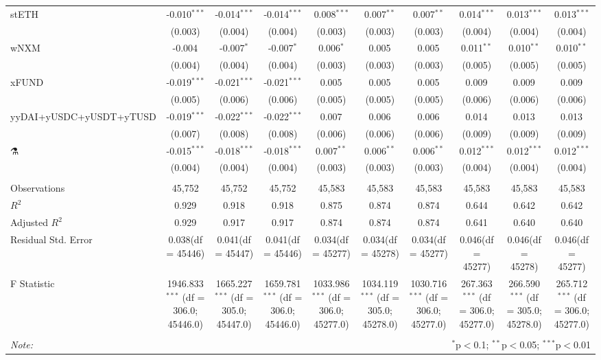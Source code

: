 \begin{table}[!htbp]
\begin{tabular}{@{\extracolsep{5pt}}lccccccccc}
 stETH & -0.010$^{***}$ & -0.014$^{***}$ & -0.014$^{***}$ & 0.008$^{***}$ & 0.007$^{**}$ & 0.007$^{**}$ & 0.014$^{***}$ & 0.013$^{***}$ & 0.013$^{***}$ \\
  & (0.003) & (0.004) & (0.004) & (0.003) & (0.003) & (0.003) & (0.004) & (0.004) & (0.004) \\
 wNXM & -0.004$^{}$ & -0.007$^{*}$ & -0.007$^{*}$ & 0.006$^{*}$ & 0.005$^{}$ & 0.005$^{}$ & 0.011$^{**}$ & 0.010$^{**}$ & 0.010$^{**}$ \\
  & (0.004) & (0.004) & (0.004) & (0.003) & (0.003) & (0.003) & (0.005) & (0.005) & (0.005) \\
 xFUND & -0.019$^{***}$ & -0.021$^{***}$ & -0.021$^{***}$ & 0.005$^{}$ & 0.005$^{}$ & 0.005$^{}$ & 0.009$^{}$ & 0.009$^{}$ & 0.009$^{}$ \\
  & (0.005) & (0.006) & (0.006) & (0.005) & (0.005) & (0.005) & (0.006) & (0.006) & (0.006) \\
 yyDAI+yUSDC+yUSDT+yTUSD & -0.019$^{***}$ & -0.022$^{***}$ & -0.022$^{***}$ & 0.007$^{}$ & 0.006$^{}$ & 0.006$^{}$ & 0.014$^{}$ & 0.013$^{}$ & 0.013$^{}$ \\
  & (0.007) & (0.008) & (0.008) & (0.006) & (0.006) & (0.006) & (0.009) & (0.009) & (0.009) \\
 ⚗️ & -0.015$^{***}$ & -0.018$^{***}$ & -0.018$^{***}$ & 0.007$^{**}$ & 0.006$^{**}$ & 0.006$^{**}$ & 0.012$^{***}$ & 0.012$^{***}$ & 0.012$^{***}$ \\
  & (0.004) & (0.004) & (0.004) & (0.003) & (0.003) & (0.003) & (0.004) & (0.004) & (0.004) \\
\hline \\[-1.8ex]
 Observations & 45,752 & 45,752 & 45,752 & 45,583 & 45,583 & 45,583 & 45,583 & 45,583 & 45,583 \\
 $R^2$ & 0.929 & 0.918 & 0.918 & 0.875 & 0.874 & 0.874 & 0.644 & 0.642 & 0.642 \\
 Adjusted $R^2$ & 0.929 & 0.917 & 0.917 & 0.874 & 0.874 & 0.874 & 0.641 & 0.640 & 0.640 \\
 Residual Std. Error & 0.038(df = 45446) & 0.041(df = 45447) & 0.041(df = 45446) & 0.034(df = 45277) & 0.034(df = 45278) & 0.034(df = 45277) & 0.046(df = 45277) & 0.046(df = 45278) & 0.046(df = 45277)  \\
 F Statistic & 1946.833$^{***}$ (df = 306.0; 45446.0) & 1665.227$^{***}$ (df = 305.0; 45447.0) & 1659.781$^{***}$ (df = 306.0; 45446.0) & 1033.986$^{***}$ (df = 306.0; 45277.0) & 1034.119$^{***}$ (df = 305.0; 45278.0) & 1030.716$^{***}$ (df = 306.0; 45277.0) & 267.363$^{***}$ (df = 306.0; 45277.0) & 266.590$^{***}$ (df = 305.0; 45278.0) & 265.712$^{***}$ (df = 306.0; 45277.0) \\
\hline
\hline \\[-1.8ex]
\textit{Note:} & \multicolumn{9}{r}{$^{*}$p$<$0.1; $^{**}$p$<$0.05; $^{***}$p$<$0.01} \\
\end{tabular}
\end{table}